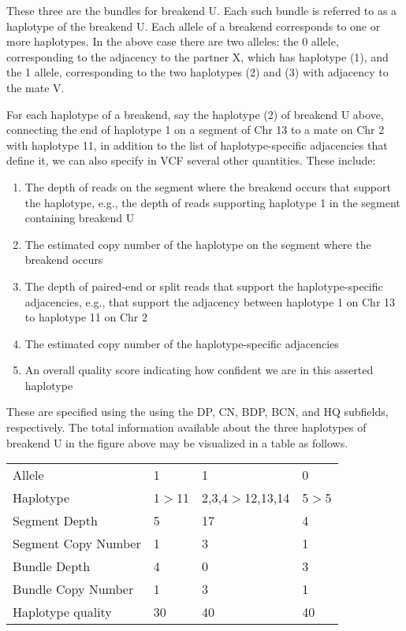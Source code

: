 \documentclass[8pt]{article}
\begin{document}
These three are the bundles for breakend U. Each such bundle is referred to as a haplotype of the breakend U. Each allele of a breakend corresponds to one or more haplotypes. In the above case there are two alleles: the 0 allele, corresponding to the adjacency to the partner X, which has haplotype (1), and the 1 allele, corresponding to the two haplotypes (2) and (3) with adjacency to the mate V.

For each haplotype of a breakend, say the haplotype (2) of breakend U above, connecting the end of haplotype 1 on a segment of Chr 13 to a mate on Chr 2 with haplotype 11, in addition to the list of haplotype-specific adjacencies that define it, we can also specify in VCF several other quantities. These include:

\begin{enumerate}
  \item The depth of reads on the segment where the breakend occurs that support the haplotype, e.g., the depth of reads supporting haplotype 1 in the segment containing breakend U
  \item The estimated copy number of the haplotype on the segment where the breakend occurs
  \item The depth of paired-end or split reads that support the haplotype-specific adjacencies, e.g., that support the adjacency between haplotype 1 on Chr 13 to haplotype 11 on Chr 2
  \item The estimated copy number of the haplotype-specific adjacencies
  \item An overall quality score indicating how confident we are in this asserted haplotype
\end{enumerate}
These are specified using the using the DP, CN, BDP, BCN, and HQ subfields, respectively. The total information available about the three haplotypes of breakend U in the figure above may be visualized in a table as follows.

\vspace{0.3cm}
\begin{tabular}{ l l l l }
Allele & 1 & 1 & 0 \\
Haplotype & 1$>$11 & 2,3,4$>$12,13,14 &	5$>$5 \\
Segment Depth & 5 & 17 & 4 \\
Segment Copy Number	& 1 & 3	& 1 \\
Bundle Depth & 4 & 0 & 3 \\
Bundle Copy Number & 1 & 3 & 1 \\
Haplotype quality & 30 & 40 & 40 \\
\end{tabular}
\end{document}
